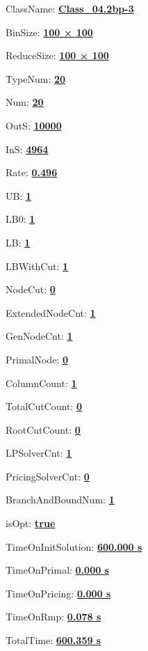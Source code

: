 \documentclass[11pt]{article}
\begin{document}
\pagestyle{empty}


ClassName: \underline{\textbf{Class_04.2bp-3}}
\par
BinSize: \underline{\textbf{100 × 100}}
\par
ReduceSize: \underline{\textbf{100 × 100}}
\par
TypeNum: \underline{\textbf{20}}
\par
Num: \underline{\textbf{20}}
\par
OutS: \underline{\textbf{10000}}
\par
InS: \underline{\textbf{4964}}
\par
Rate: \underline{\textbf{0.496}}
\par
UB: \underline{\textbf{1}}
\par
LB0: \underline{\textbf{1}}
\par
LB: \underline{\textbf{1}}
\par
LBWithCut: \underline{\textbf{1}}
\par
NodeCut: \underline{\textbf{0}}
\par
ExtendedNodeCnt: \underline{\textbf{1}}
\par
GenNodeCnt: \underline{\textbf{1}}
\par
PrimalNode: \underline{\textbf{0}}
\par
ColumnCount: \underline{\textbf{1}}
\par
TotalCutCount: \underline{\textbf{0}}
\par
RootCutCount: \underline{\textbf{0}}
\par
LPSolverCnt: \underline{\textbf{1}}
\par
PricingSolverCnt: \underline{\textbf{0}}
\par
BranchAndBoundNum: \underline{\textbf{1}}
\par
isOpt: \underline{\textbf{true}}
\par
TimeOnInitSolution: \underline{\textbf{600.000 s}}
\par
TimeOnPrimal: \underline{\textbf{0.000 s}}
\par
TimeOnPricing: \underline{\textbf{0.000 s}}
\par
TimeOnRmp: \underline{\textbf{0.078 s}}
\par
TotalTime: \underline{\textbf{600.359 s}}
\par
\newpage
\end{document}
